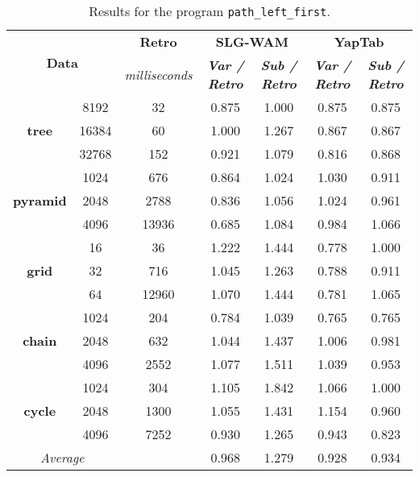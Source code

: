 \begin{table}[ht]
\centering
\footnotesize{
  \begin{tabular}{cc|c|cc|cc}
   \hline
    \hline
    \multicolumn{2}{c|}{\multirow{2}{*}{\small{\textbf{Data}}}} & \textbf{\small{Retro}} & \multicolumn{2}{c|}{\small{\textbf{SLG-WAM}}} & \multicolumn{2}{c}{\small{\textbf{YapTab}}} \\
     \multicolumn{2}{c|}{} & \scriptsize{\textit{milliseconds}} & \textbf{\textit{\scriptsize{Var / Retro}}} & \textbf{\textit{\scriptsize{Sub / Retro}}} & \textbf{\textit{\scriptsize{Var / Retro}}} & \textbf{\textit{\scriptsize{Sub / Retro}}} \\
   \hline
   \hline

\multirow{3}{*}{\textbf{tree}} &  8192 &  32 &  0.875  &  1.000  &  0.875 & 0.875 \\
&  16384 &  60 &  1.000  &  1.267  &  0.867 & 0.867 \\
&  32768 &  152 &  0.921  &  1.079  &  0.816 & 0.868 \\
\hline
\multirow{3}{*}{\textbf{pyramid}} &  1024 &  676 &  0.864  &  1.024  &  1.030 & 0.911 \\
&  2048 &  2788 &  0.836  &  1.056  &  1.024 & 0.961 \\
&  4096 &  13936 &  0.685  &  1.084  &  0.984 & 1.066 \\
\hline
\multirow{3}{*}{\textbf{grid}} &  16 &  36 &  1.222  &  1.444  &  0.778 & 1.000 \\
&  32 &  716 &  1.045  &  1.263  &  0.788 & 0.911 \\
&  64 &  12960 &  1.070  &  1.444  &  0.781 & 1.065 \\
\hline
\multirow{3}{*}{\textbf{chain}} &  1024 &  204 &  0.784  &  1.039  &  0.765 & 0.765 \\
&  2048 &  632 &  1.044  &  1.437  &  1.006 & 0.981 \\
&  4096 &  2552 &  1.077  &  1.511  &  1.039 & 0.953 \\
\hline
\multirow{3}{*}{\textbf{cycle}} &  1024 &  304 &  1.105  &  1.842  &  1.066 & 1.000 \\
&  2048 &  1300 &  1.055  &  1.431  &  1.154 & 0.960 \\
&  4096 &  7252 &  0.930  &  1.265  &  0.943 & 0.823 \\
\hline
\hline
\multicolumn{2}{c}{\textit{Average}} & & 0.968 & 1.279 & 0.928 & 0.934 \\ 
\hline
\hline
\end{tabular}
}
\caption{Results for the program \texttt{path\_left\_first}.}
\label{tbl:prefix_path_left_first}
\end{table}

